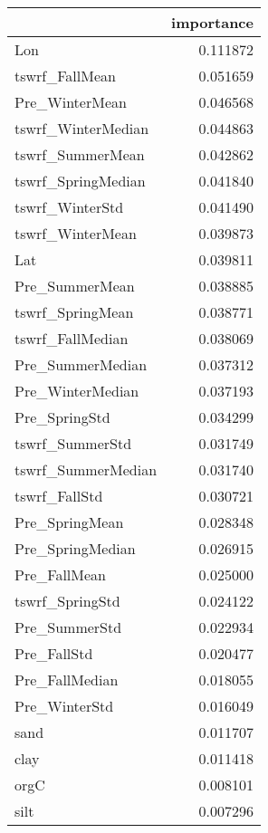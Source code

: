 \begin{tabular}{lr}
\toprule
 & importance \\
\midrule
Lon & 0.111872 \\
tswrf_FallMean & 0.051659 \\
Pre_WinterMean & 0.046568 \\
tswrf_WinterMedian & 0.044863 \\
tswrf_SummerMean & 0.042862 \\
tswrf_SpringMedian & 0.041840 \\
tswrf_WinterStd & 0.041490 \\
tswrf_WinterMean & 0.039873 \\
Lat & 0.039811 \\
Pre_SummerMean & 0.038885 \\
tswrf_SpringMean & 0.038771 \\
tswrf_FallMedian & 0.038069 \\
Pre_SummerMedian & 0.037312 \\
Pre_WinterMedian & 0.037193 \\
Pre_SpringStd & 0.034299 \\
tswrf_SummerStd & 0.031749 \\
tswrf_SummerMedian & 0.031740 \\
tswrf_FallStd & 0.030721 \\
Pre_SpringMean & 0.028348 \\
Pre_SpringMedian & 0.026915 \\
Pre_FallMean & 0.025000 \\
tswrf_SpringStd & 0.024122 \\
Pre_SummerStd & 0.022934 \\
Pre_FallStd & 0.020477 \\
Pre_FallMedian & 0.018055 \\
Pre_WinterStd & 0.016049 \\
sand & 0.011707 \\
clay & 0.011418 \\
orgC & 0.008101 \\
silt & 0.007296 \\
\bottomrule
\end{tabular}
